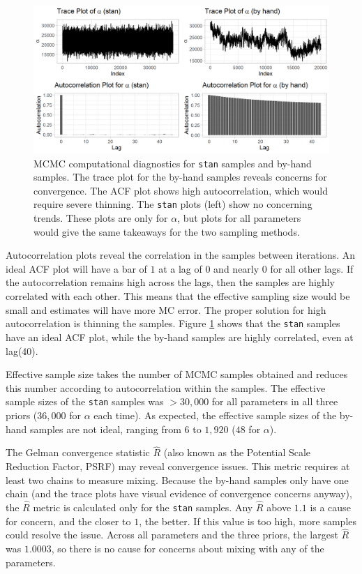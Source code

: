 \documentclass[11pt]{article}
\newcommand{\code}{\texttt}
\begin{document}
\begin{figure}[ht]
    \centering
    \includegraphics[width=.7\textwidth]{diagnostics.png}
    \caption{\footnotesize MCMC computational diagnostics for \code{stan} samples and by-hand samples. The trace plot for the by-hand samples reveals concerns for convergence. The ACF plot shows high autocorrelation, which would require severe thinning. The \code{stan} plots (left) show no concerning trends. These plots are only for $\alpha$, but plots for all parameters would give the same takeaways for the two sampling methods. \vspace*{-.5\baselineskip}}
    \label{fig:diagnostics}
\end{figure}

Autocorrelation plots reveal the correlation in the samples between iterations. An ideal ACF plot will have a bar of $1$ at a lag of $0$ and nearly $0$ for all other lags. If the autocorrelation remains high across the lags, then the samples are highly correlated with each other. This means that the effective sampling size would be small and estimates will have more MC error. The proper solution for high autocorrelation is thinning the samples. Figure \ref{fig:diagnostics} shows that the \code{stan} samples have an ideal ACF plot, while the by-hand samples are highly correlated, even at lag(40). 

Effective sample size takes the number of MCMC samples obtained and reduces this number according to autocorrelation within the samples. The effective sample sizes of the \code{stan} samples was $>30{,}000$ for all parameters in all three priors ($36{,}000$ for $\alpha$ each time). As expected, the effective sample sizes of the by-hand samples are not ideal, ranging from $6$ to $1{,}920$ ($48$ for $\alpha$).  

The Gelman convergence statistic $\hat{R}$ (also known as the Potential Scale Reduction Factor, PSRF) may reveal convergence issues. This metric requires at least two chains to measure mixing. Because the by-hand samples only have one chain (and the trace plots have visual evidence of convergence concerns anyway), the $\hat{R}$ metric is calculated only for the \code{stan} samples. Any $\hat{R}$ above $1.1$ is a cause for concern, and the closer to $1$, the better. If this value is too high, more samples could resolve the issue. Across all parameters and the three priors, the largest $\hat{R}$ was $1.0003$, so there is no cause for concerns about mixing with any of the parameters.
\end{document}

